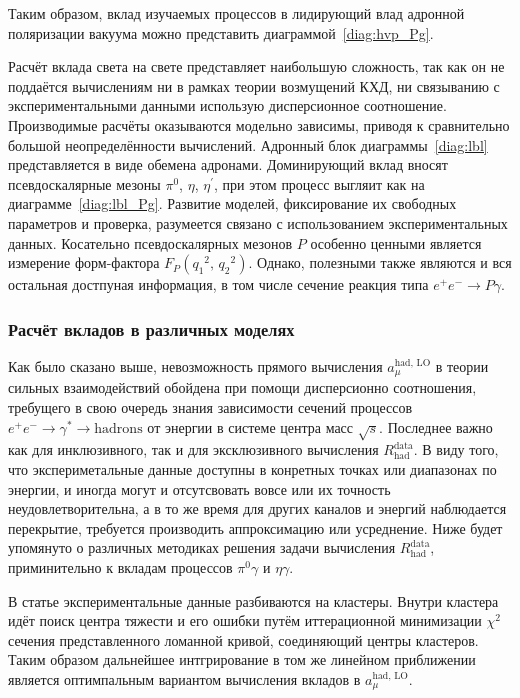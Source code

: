 Таким образом,
вклад изучаемых процессов в лидирующий влад адронной поляризации вакуума можно представить диаграммой~\ref{diag:hvp_Pg}.

Расчёт вклада света на свете представляет наибольшую сложность,
так как он не поддаётся вычислениям ни в рамках теории возмущений КХД,
ни связыванию с экспериментальными данными использую дисперсионное соотношение.
Производимые расчёты оказываются модельно зависимы,
приводя к сравнительно большой неопределённости вычислений.
Адронный блок диаграммы~\ref{diag:lbl} представляется в виде обемена адронами.
Доминирующий вклад вносят псевдоскалярные мезоны $\pi^0$, $\eta$, $\eta^\prime$,
при этом процесс выгляит как на диаграмме~\ref{diag:lbl_Pg}.
Развитие моделей,
фиксирование их свободных параметров и проверка,
разумеется связано с использованием экспериментальных данных.
Косательно псевдоскалярных мезонов $P$ особенно ценными является измерение форм-фактора
$F_P ( {q_1}^2, \, {q_2}^2 )$.
Однако, полезными также являются и вся остальная достпуная информация,
в том числе сечение реакция типа $e^+ e^- \to P \gamma$.


\subsubsection{Расчёт вкладов в различных моделях}
\label{contribution-calculation}


Как было сказано выше,
невозможность прямого вычисления $a_\mu^{\text{had, LO}}$
в теории сильных взаимодействий обойдена при помощи дисперсионно соотношения,
требущего в свою очередь знания зависимости сечений процессов
$e^+ e^- \to \gamma^* \to \text{hadrons}$
от энергии в системе центра масс $\sqrt{s}$.
Последнее важно как для инклюзивного,
так и для эксклюзивного вычисления $R_{\text{had}}^{\text{data}}$.
В виду того,
что экспериметальные данные доступны в конретных точках или диапазонах по энергии,
и иногда могут и отсутсвовать вовсе или их точность неудовлетворительна,
а в то же время для других каналов и энергий наблюдается перекрытие,
требуется производить аппроксимацию или усреднение.
Ниже будет упомянуто о различных методиках решения задачи вычисления $R_{\text{had}}^{\text{data}}$,
приминительно к вкладам процессов $\pi^0 \gamma$ и $\eta \gamma$.


В статье \cite{KNT18} экспериментальные данные разбиваются на кластеры.
Внутри кластера идёт поиск центра тяжести и его ошибки путём иттерационной минимизации $\chi^2$ сечения
представленного ломанной кривой, соединяющий центры кластеров.
Таким образом дальнейшее интгрирование в том же линейном приближении является оптимпальным вариантом вычисления вкладов в $a_\mu^{\text{had, LO}}$.

